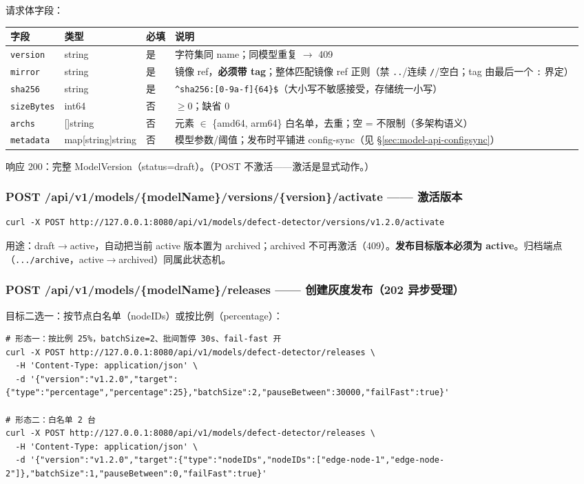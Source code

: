 请求体字段：

\begin{tabularx}{\textwidth}{l l l X}
  \toprule
  \textbf{字段} & \textbf{类型} & \textbf{必填} & \textbf{说明} \\
  \midrule
  \texttt{version} & string & 是 & 字符集同 name；同模型重复 $\rightarrow$ 409 \\
  \texttt{mirror} & string & 是 & 镜像 ref，\textbf{必须带 tag}；整体匹配镜像 ref 正则（禁 \texttt{..}/连续 \texttt{/}/空白；tag 由最后一个 \texttt{:} 界定） \\
  \texttt{sha256} & string & 是 & \verb|^sha256:[0-9a-f]{64}$|（大小写不敏感接受，存储统一小写） \\
  \texttt{sizeBytes} & int64 & 否 & $\geq$0；缺省 0 \\
  \texttt{archs} & []string & 否 & 元素 $\in$ \{amd64, arm64\} 白名单，去重；空 = 不限制（多架构语义） \\
  \texttt{metadata} & map[string]string & 否 & 模型参数/阈值；发布时平铺进 config-sync（见 \S\ref{sec:model-api-configsync}） \\
  \bottomrule
\end{tabularx}

响应 200：完整 ModelVersion（status=draft）。（POST 不激活——激活是显式动作。）

\subsubsection{POST /api/v1/models/\{modelName\}/versions/\{version\}/activate —— 激活版本}

\begin{lstlisting}
curl -X POST http://127.0.0.1:8080/api/v1/models/defect-detector/versions/v1.2.0/activate
\end{lstlisting}

用途：draft$\rightarrow$active，自动把当前 active 版本置为 archived；archived 不可再激活（409）。\textbf{发布目标版本必须为 active}。归档端点（\texttt{.../archive}，active$\rightarrow$archived）同属此状态机。

\subsubsection{POST /api/v1/models/\{modelName\}/releases —— 创建灰度发布（202 异步受理）}

目标二选一：按节点白名单（nodeIDs）或按比例（percentage）：

\begin{lstlisting}
# 形态一：按比例 25%，batchSize=2、批间暂停 30s、fail-fast 开
curl -X POST http://127.0.0.1:8080/api/v1/models/defect-detector/releases \
  -H 'Content-Type: application/json' \
  -d '{"version":"v1.2.0","target":{"type":"percentage","percentage":25},"batchSize":2,"pauseBetween":30000,"failFast":true}'

# 形态二：白名单 2 台
curl -X POST http://127.0.0.1:8080/api/v1/models/defect-detector/releases \
  -H 'Content-Type: application/json' \
  -d '{"version":"v1.2.0","target":{"type":"nodeIDs","nodeIDs":["edge-node-1","edge-node-2"]},"batchSize":1,"pauseBetween":0,"failFast":true}'
\end{lstlisting}

